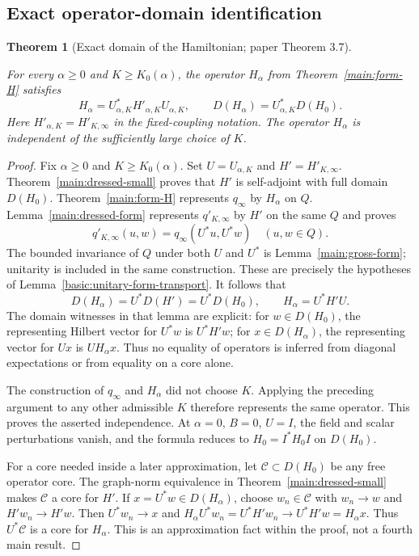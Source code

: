 \documentclass[11pt,a4paper]{article}
\newtheorem{theorem}{Theorem}[section]
\theoremstyle{definition}
\theoremstyle{remark}
\newcommand{\proofid}[1]{\par\smallskip{\normalfont\scriptsize\color{inkblue}Stable ID: \nolinkurl{#1}}\par\smallskip}
\begin{document}
\subsection{Exact operator-domain identification}

\begin{theorem}[Exact domain of the Hamiltonian; paper Theorem 3.7]
\label{main:domain}
\proofid{main:domain}
\par{}\par\smallskip

For every $\alpha\geq0$ and $K\geq K_0(\alpha)$, the operator $H_\alpha$ from
Theorem~\ref{main:form-H} satisfies
\[
 H_\alpha=U_{\alpha,K}^*H'_{\alpha,K}U_{\alpha,K},\qquad
 D(H_\alpha)=U_{\alpha,K}^*D(H_0).
\]
Here $H'_{\alpha,K}=H'_{K,\infty}$ in the fixed-coupling notation.
The operator $H_\alpha$ is independent of the sufficiently large choice of $K$.
\end{theorem}
\begin{proof}
Fix $\alpha\geq0$ and $K\geq K_0(\alpha)$. Set
$U=U_{\alpha,K}$ and $H'=H'_{K,\infty}$. Theorem~\ref{main:dressed-small}
proves that $H'$ is self-adjoint with full domain $D(H_0)$.
Theorem~\ref{main:form-H} represents $q_\infty$ by $H_\alpha$ on
$Q$. Lemma~\ref{main:dressed-form} represents $q'_{K,\infty}$ by
$H'$ on the same $Q$ and proves
\[
 q'_{K,\infty}(u,w)=q_\infty(U^*u,U^*w)\quad(u,w\in Q).
\]
The bounded invariance of $Q$ under both $U$ and $U^*$ is
Lemma~\ref{main:gross-form}; unitarity is included in the same
construction. These are precisely the hypotheses of
Lemma~\ref{basic:unitary-form-transport}. It follows that
\[
 D(H_\alpha)=U^*D(H')=U^*D(H_0),\qquad
 H_\alpha=U^*H'U.
\]
The domain witnesses in that lemma are explicit: for
$w\in D(H_0)$, the representing Hilbert vector for $U^*w$ is
$U^*H'w$; for $x\in D(H_\alpha)$, the representing vector for
$Ux$ is $UH_\alpha x$. Thus no equality of operators is inferred
from diagonal expectations or from equality on a core alone.

The construction of $q_\infty$ and $H_\alpha$ did not choose $K$.
Applying the preceding argument to any other admissible $K$ therefore
represents the same operator. This proves the asserted independence.
At $\alpha=0$, $B=0$, $U=I$, the field and scalar perturbations
vanish, and the formula reduces to $H_0=I^*H_0I$ on $D(H_0)$.

For a core needed inside a later approximation, let
$\mathcal C\subset D(H_0)$ be any free operator core.
The graph-norm equivalence in Theorem~\ref{main:dressed-small}
makes $\mathcal C$ a core for $H'$. If $x=U^*w\in D(H_\alpha)$,
choose $w_n\in\mathcal C$ with $w_n\to w$ and $H'w_n\to H'w$.
Then $U^*w_n\to x$ and
$H_\alpha U^*w_n=U^*H'w_n\to U^*H'w=H_\alpha x$.
Thus $U^*\mathcal C$ is a core for $H_\alpha$. This is an
approximation fact within the proof, not a fourth main result.
\end{proof}
\end{document}
